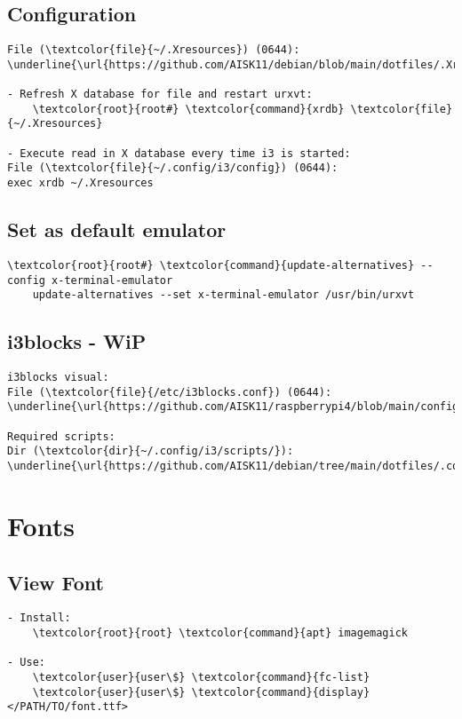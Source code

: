 \documentclass[10pt, a4paper, onecolumn, openany]{book} %
\begin{document}
\subsection{Configuration}
\begin{Verbatim}[commandchars=\\\{\}]
File (\textcolor{file}{~/.Xresources}) (0644):
\underline{\url{https://github.com/AISK11/debian/blob/main/dotfiles/.Xresources}}

- Refresh X database for file and restart urxvt:
    \textcolor{root}{root#} \textcolor{command}{xrdb} \textcolor{file}{~/.Xresources}

- Execute read in X database every time i3 is started:
File (\textcolor{file}{~/.config/i3/config}) (0644):
exec xrdb ~/.Xresources    
\end{Verbatim}
\subsection{Set as default emulator}
\begin{Verbatim}[commandchars=\\\{\}]    
    \textcolor{root}{root#} \textcolor{command}{update-alternatives} --config x-terminal-emulator
    update-alternatives --set x-terminal-emulator /usr/bin/urxvt

\end{Verbatim}


\subsection{i3blocks - WiP}
\begin{Verbatim}[commandchars=\\\{\}]
i3blocks visual:
File (\textcolor{file}{/etc/i3blocks.conf}) (0644):
\underline{\url{https://github.com/AISK11/raspberrypi4/blob/main/config_files/i3blocks.conf}}

Required scripts:
Dir (\textcolor{dir}{~/.config/i3/scripts/}):
\underline{\url{https://github.com/AISK11/debian/tree/main/dotfiles/.config/i3/scripts}}
\end{Verbatim}

\section{Fonts}
\subsection{View Font}
\begin{Verbatim}[commandchars=\\\{\}]
- Install:
    \textcolor{root}{root} \textcolor{command}{apt} imagemagick
    
- Use:
    \textcolor{user}{user\$} \textcolor{command}{fc-list} 
    \textcolor{user}{user\$} \textcolor{command}{display} </PATH/TO/font.ttf>
\end{Verbatim}
\end{document}
